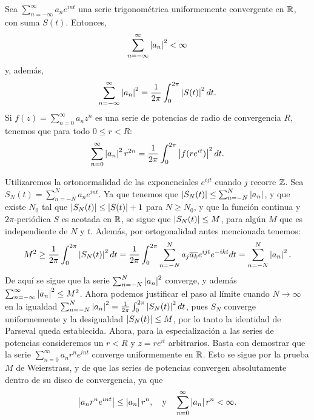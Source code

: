\begin{theo}[Parseval]\label{teo-identidad-Parseval}
    Sea \(\sum_{n=-\infty}^{\infty}a_ne^{int}\) una serie trigonométrica uniformemente convergente en \(\mathbb{R}\), con suma
    \(S(t)\). Entonces,
    \[
    \sum_{n=-\infty}^{\infty} \left\lvert a_n\right\rvert^2 < \infty
    \]
    y, además,
    \[
    \sum_{n=-\infty}^{\infty} \left\lvert a_n\right\rvert^2 = \frac{1}{2\pi} \int_{0}^{2\pi} \left\lvert S(t)\right\rvert^2 dt.
    \]
    Si \(f(z) = \sum_{n=0}^{\infty}a_nz^{n}\) es una serie de potencias de radio de convergencia \(R\), tenemos que 
    para todo \(0\leq r < R\):
    \[
    \sum_{n=0}^{\infty}\left\lvert a_n\right\rvert^2 r^{2n} = \frac{1}{2\pi} \int_{0}^{2\pi} \left\lvert f(re^{it})\right\rvert^2 dt.
    \]
\end{theo}
\begin{dem}
    Utilizaremos la ortonormalidad de las exponenciales \(e^{ijt}\) cuando \(j\) recorre \(\mathbb{Z}\). Sea \(S_N(t) = \sum_{n=-N}^{N}a_n e^{int}\).
    Ya que tenemos que \(\left\lvert S_N(t)\right\rvert \leq \sum_{n=-N}^{N}\left\lvert a_n\right\rvert\), y que existe \(N_0\) tal que \(\left\lvert S_N(t)\right\rvert\leq \left\lvert S(t)\right\rvert + 1\) para 
    \(N\geq N_0\), y que la función continua y \(2\pi\)-periódica \(S\) es acotada en \(\mathbb{R}\), se sigue que \(\left\lvert S_N(t)\right\rvert \leq M\), para algún 
    \(M\) que es independiente de \(N\) y \(t\). Además, por ortogonalidad antes mencionada tenemos:
    \[
    M^2 \geq \frac{1}{2\pi}\int_{0}^{2\pi} \left\lvert S_N(t)\right\rvert^2 dt = \frac{1}{2\pi} \int_{0}^{2\pi}\sum_{n=-N}^{N} a_j \overline{a_k} e^{ijt}e^{-ikt} dt 
    = \sum_{n=-N}^{N} \left\lvert a_n\right\rvert^2.
    \]
    De aquí se sigue que la serie \(\sum_{n=-N}^{N}\left\lvert a_n\right\rvert^2\) converge, y además \(\sum_{n=-\infty}^{\infty}\left\lvert a_n\right\rvert^2 \leq M^2 \). Ahora 
    podemos justificar el paso al límite cuando \(N \to \infty\) en la igualdad 
    \(\sum_{n=-N}^{N} \left\lvert a_n\right\rvert^2 = \frac{1}{2\pi}\int_{0}^{2\pi} \left\lvert S_N(t)\right\rvert^2 dt\), pues \(S_N\) converge uniformemente y la desigualdad 
    \(\left\lvert S_N(t)\right\rvert\leq M\), por lo tanto la identidad de Parseval queda establecida. Ahora, para la especialización a las series de potencias
    consideremos un \(r<R\) y \(z = re^{it}\) arbitrarios. Basta con demostrar que la serie \(\sum_{n=0}^{\infty}a_nr^ne^{int}\) converge 
    uniformemente en \(\mathbb{R}\). Esto se sigue por la prueba \(M\) de Weierstrass, y de que las series de potencias convergen absolutamente dentro 
    de su disco de convergencia, ya que
    \[
    \left\lvert a_nr^n e^{int}\right\rvert \leq \left\lvert a_n\right\rvert r^n, \quad \text{y}\quad \sum_{n=0}^{\infty} \left\lvert a_n\right\rvert r^n < \infty.
    \]

\end{dem}
